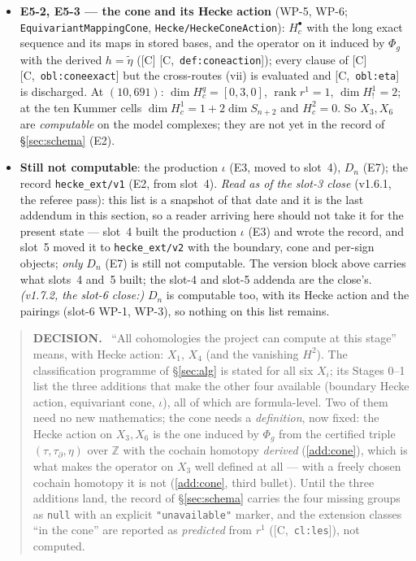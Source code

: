 \documentclass[11pt]{article}
\theoremstyle{remark}
\newcommand{\Z}{\mathbb{Z}}
\DeclareMathOperator{\rank}{rank}
\newcommand{\Dn}{D_n}
\newcommand{\HA}[1]{[C,~\texttt{#1}]}      %
\newenvironment{decisionbox}
  {\par\medskip\noindent\begin{quote}\textbf{DECISION.}\ }
  {\end{quote}\medskip}
\begin{document}
\begin{itemize}
  the sharpness identity is Claim~\ref{cl:sharpbound}. With them, the mode-dependence of
  the sub-block order after a split (Certificate~\ref{sec:localcert}, closing paragraph)
  and the two \texttt{phase\_reached} keys of \S\ref{sec:schema}.
\item \textbf{E5-2, E5-3 --- the cone and its Hecke action} (WP-5, WP-6;
  \texttt{EquivariantMappingCone}, \texttt{Hecke/HeckeConeAction}): $H^\bullet_c$ with the long
  exact sequence and its maps in stored bases, and the operator on it induced by $\Phi_g$ with
  the derived $h=\tilde\eta$ ([C] \HA{def:coneaction}); every clause of [C]
  \HA{obl:coneexact} but the cross-routes (vii) is evaluated and \HA{obl:eta} is discharged. At
  $(10,691)$: $\dim H^q_c=[0,3,0]$, $\rank r^1=1$, $\dim H^1_!=2$; at the ten Kummer cells
  $\dim H^1_c=1+2\dim S_{n+2}$ and $H^2_c=0$. So $X_3,X_6$ are \emph{computable} on the model
  complexes; they are not yet in the record of \S\ref{sec:schema} (E2).
\item \textbf{Still not computable}: the production $\iota$ (E3, moved to slot~4), $\Dn$ (E7);
  the record \texttt{hecke\_ext/v1} (E2, from slot~4). \emph{Read as of the slot-3 close}
  (v1.6.1, the referee pass): this list is a snapshot of that date and it is the last
  addendum in this section, so a reader arriving here should not take it for the present
  state --- slot~4 built the production $\iota$ (E3) and wrote the record, and slot~5 moved
  it to \texttt{hecke\_ext/v2} with the boundary, cone and per-sign objects; \emph{only} $\Dn$
  (E7) is still not computable. The version block above carries what slots~4 and~5 built; the
  slot-4 and slot-5 addenda are the close's. \emph{(v1.7.2, the slot-6 close:)} $\Dn$ is
  computable too, with its Hecke action and the pairings (slot-6 WP-1, WP-3), so nothing on
  this list remains.
\end{itemize}

\begin{decisionbox}
``All cohomologies the project can compute at this stage'' means, with Hecke action:
$X_1$, $X_4$ (and the vanishing $H^2$). The classification programme of
\S\ref{sec:alg} is stated for all six $X_i$; its Stages 0--1 list the three additions that
make the other four available (boundary Hecke action, equivariant cone, $\iota$), all of
which are formula-level. Two of them need no new mathematics; the cone needs a \emph{definition},
now fixed: the Hecke action on $X_3,X_6$ is the one induced by $\Phi_g$ from the certified triple
$(\tau,\tau_\partial,\eta)$ over $\Z$ with the cochain homotopy \emph{derived} (\ref{add:cone}), which is
what makes the operator on $X_3$ well defined at all --- with a freely chosen cochain homotopy it is
not (\ref{add:cone}, third bullet). Until the three additions land, the record of
\S\ref{sec:schema} carries the four missing groups as \texttt{null} with an explicit
\texttt{"unavailable"} marker, and the extension classes ``in the cone'' are reported as
\emph{predicted} from $r^1$ (\HA{cl:les}), not computed.
\end{decisionbox}
\end{document}
